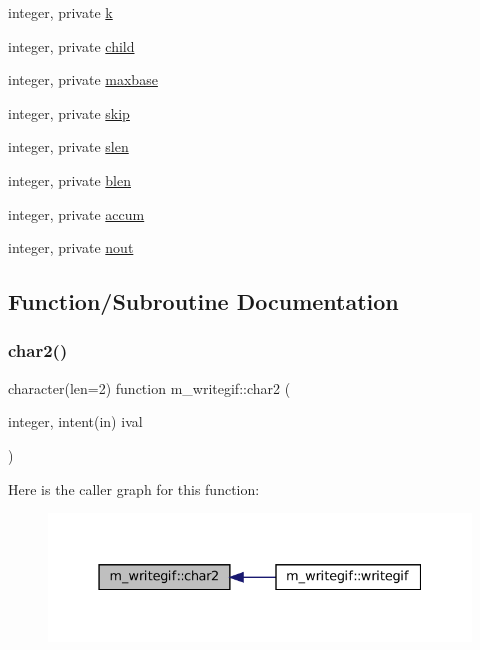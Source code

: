 \begin{DoxyCompactItemize}
\item 
integer, private \mbox{\hyperlink{namespacem__writegif_a29211b5bf371e3be08c3047bc80d3e91}{k}}
\item 
integer, private \mbox{\hyperlink{namespacem__writegif_a5e1b83b3bc6e486c730832371c48f6e0}{child}}
\item 
integer, private \mbox{\hyperlink{namespacem__writegif_ae052e1663af721294a611d19b300a8ef}{maxbase}}
\item 
integer, private \mbox{\hyperlink{namespacem__writegif_aaf7927ca24ee3d409138c18d7d254433}{skip}}
\item 
integer, private \mbox{\hyperlink{namespacem__writegif_ad3e590b43489ea5d2c357953adaca817}{slen}}
\item 
integer, private \mbox{\hyperlink{namespacem__writegif_add860aadf7250b3b589b697cc90fcccf}{blen}}
\item 
integer, private \mbox{\hyperlink{namespacem__writegif_a2a80a14e30c6ed2b0003d46a93480531}{accum}}
\item 
integer, private \mbox{\hyperlink{namespacem__writegif_a91b7b1d0dd2ced615d855f3440716415}{nout}}
\end{DoxyCompactItemize}


\subsection{Function/\+Subroutine Documentation}
\mbox{\label{namespacem__writegif_a79ebbfd4c7df8520a82c75c3a62f0c96}} 
\subsubsection{\texorpdfstring{char2()}{char2()}}
{\footnotesize\ttfamily character(len=2) function m\+\_\+writegif\+::char2 (\begin{DoxyParamCaption}\item[{integer, intent(in)}]{ival }\end{DoxyParamCaption})\hspace{0.3cm}{\ttfamily [private]}}

Here is the caller graph for this function\+:\nopagebreak
\begin{figure}[H]
\begin{center}
\leavevmode
\includegraphics[width=331pt]{namespacem__writegif_a79ebbfd4c7df8520a82c75c3a62f0c96_icgraph}
\end{center}
\end{figure}
\mbox{\label{namespacem__writegif_a48c5ca5487be9dbe565c0d4f8aa02d0d}} 
